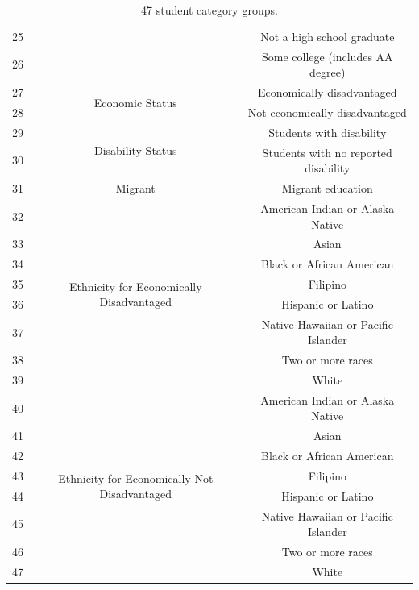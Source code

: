 \documentclass[11pt]{article}
\begin{document}
\begin{table}[h!]
\begin{tabular}{||c|c|c||}
25 && Not a high school graduate\\ \cline{1-1}\cline{3-3}
26 && Some college (includes AA degree)\\
\hline
27 & \multirow{2}{*}{Economic Status} & Economically disadvantaged\\\cline{1-1}\cline{3-3}
28 && Not economically disadvantaged\\
\hline
29 & \multirow{2}{*}{Disability Status} & Students with disability\\\cline{1-1}\cline{3-3}
30 && Students with no reported disability\\
\hline
31 & Migrant & Migrant education\\
\hline
32 & \multirow{8}{*}{Ethnicity for Economically Disadvantaged} & American Indian or Alaska Native\\\cline{1-1}\cline{3-3}
33 && Asian\\\cline{1-1}\cline{3-3}
34 && Black or African American\\\cline{1-1}\cline{3-3}
35 && Filipino\\\cline{1-1}\cline{3-3}
36 && Hispanic or Latino\\\cline{1-1}\cline{3-3}
37 && Native Hawaiian or Pacific Islander\\\cline{1-1}\cline{3-3}
38 && Two or more races\\\cline{1-1}\cline{3-3}
39 && White\\
\hline
40 & \multirow{8}{*}{Ethnicity for Economically Not Disadvantaged} & American Indian or Alaska Native\\\cline{1-1}\cline{3-3}
41 && Asian\\\cline{1-1}\cline{3-3}
42 && Black or African American\\\cline{1-1}\cline{3-3}
43 && Filipino\\\cline{1-1}\cline{3-3}
44 && Hispanic or Latino\\\cline{1-1}\cline{3-3}
45 && Native Hawaiian or Pacific Islander\\\cline{1-1}\cline{3-3}
46 && Two or more races\\\cline{1-1}\cline{3-3}
47 && White\\
\hline
\end{tabular}
\caption{47 student category groups.}
\label{table:student_group}
\end{table}
\end{document}
